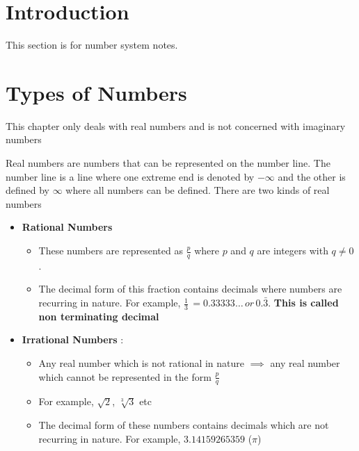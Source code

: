 \section{Introduction}
This section is for number system notes. 

\section{Types of Numbers}
\begin{WARNING}{This chapter only deals with real numbers and is not concerned with imaginary numbers}\end{WARNING}

Real numbers are numbers that can be represented on the number line. The number line is a line where one extreme end is denoted by $- \infty$ and the other is defined by $\infty$ where all numbers can be defined. There are two kinds of real numbers

\begin{itemize}
    \item \textbf{Rational Numbers} 
    \begin{itemize}
        \item These numbers are represented as $\displaystyle { \frac{p} {q} }$ where $p$ and $q$ are integers with $q \neq 0$.
        
        \item The decimal form of this fraction contains decimals where numbers are recurring in nature. For example, $\displaystyle{ \frac{1}{3} } \, = 0.33333\dots \, or \, 0.\bar{3}$. \textbf{This is called non terminating decimal}
    \end{itemize}

    \item \textbf{Irrational Numbers} : 
    \begin{itemize}
        \item Any real number which is not rational in nature $\implies$ any real number which cannot be represented in the form $\displaystyle{ \frac{p}{q} }$

        \item For example, $\sqrt{2}$, $\sqrt[3]{3}$ etc

        \item The decimal form of these numbers contains decimals which are not recurring in nature. For example, $3.14159265359$ ($\pi$)
    \end{itemize}
\end{itemize}

